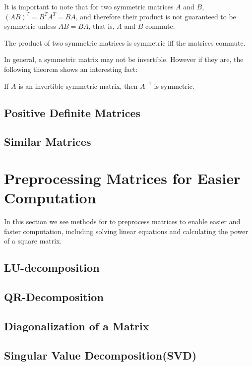 \documentclass{report}
\begin{document}
		It is important to note that for two symmetric matrices $A$ and $B$, $(AB)^T=B^TA^T=BA$, and therefore their product is not guaranteed to be symmetric unless $AB=BA$, that is, $A$ and $B$ commute.
		
		\begin{thm}
			The product of two symmetric matrices is symmetric iff the matrices commute.
		\end{thm}
		
		In general, a symmetric matrix may not be invertible. However if they are, the following theorem shows an interesting fact:
		
		\begin{thm}
			If $A$ is an invertible symmetric matrix, then $A^{-1}$ is symmetric.
		\end{thm}
		
		\subsection{Positive Definite Matrices}%
		
		\subsection{Similar Matrices}%
		
	
	\section{Preprocessing Matrices for Easier Computation}
	In this section we see methods for to preprocess matrices to enable easier and faster computation, including solving linear equations and calculating the power of a square matrix.
	
		\subsection{LU-decomposition}%
		
		\subsection{QR-Decomposition}%
		
		\subsection{Diagonalization of a Matrix}%
		
		\subsection{Singular Value Decomposition(SVD)}%
	
\end{document}
